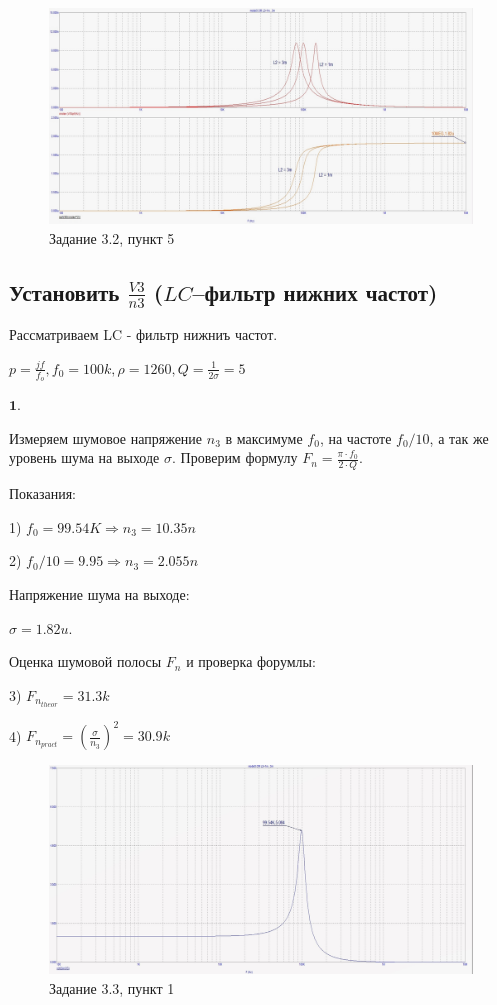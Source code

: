\documentclass[a4paper, 14pt]{extarticle}%
\begin{document}
\begin{figure}[h!]
			\centering
			\includegraphics[width=1.1\linewidth]{3/3_2_4.jpg}
			\caption{Задание 3.2, пункт 5}
			\label{A}
\end{figure}

\subsection{Установить $\frac{V3}{n3}$ ($LC$--фильтр нижних частот)}

Рассматриваем LC - фильтр нижниъ частот.

$p = \frac{jf}{f_o}, f_0 = 100k, \rho = 1260, Q = \frac{1}{2\sigma} = 5$



$\textbf{1.} $


Измеряем шумовое напряжение $n_3$ в максимуме $f_0$, на частоте $f_0/10$, а так же уровень шума на выходе $\sigma$.
Проверим формулу $F_n = \frac{\pi\cdot f_0}{2\cdot Q}$.

Показания:

1) $f_0 = 99.54K \Rightarrow n_3 = 10.35n$

2) $f_0/10 = 9.95 \Rightarrow n_3 = 2.055n$

Напряжение шума на выходе:

$\sigma = 1.82u$.

Оценка шумовой полосы $F_n$ и проверка форумлы:

3) $F_{n_{theor}} = 31.3k$

4) $F_{n_{pract}} = (\frac{\sigma}{n_3})^{2} = 30.9k$

\begin{figure}[h!]
			\centering
			\includegraphics[width=1.1\linewidth]{3/3_3_1.jpg}
			\caption{Задание 3.3, пункт 1}
			\label{A}
\end{figure}
\end{document}
